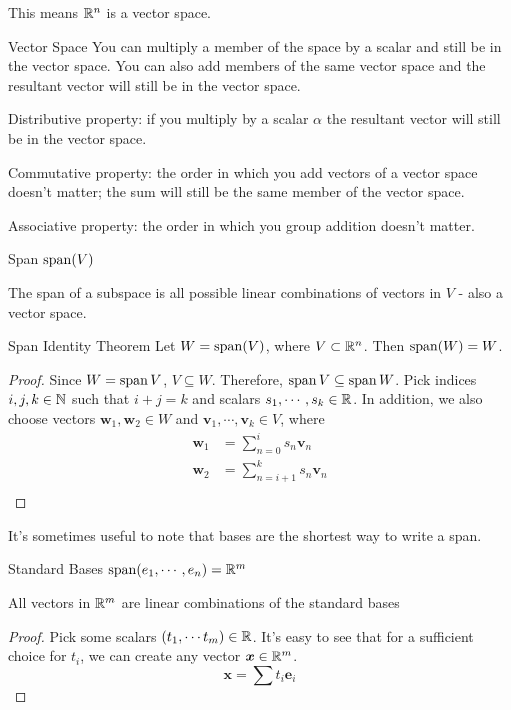 \documentclass[11pt]{article}
\begin{document}
This means $\mathbb R^n$ is a vector space.




\begin{definition}{Vector Space}
You can multiply a member of the space by a scalar and still be in the vector space.
You can also add members of the same vector space and the resultant vector will still be in the vector space.

Distributive property: if you multiply by a scalar $\alpha$ the resultant vector will still be in the vector space.

Commutative property: the order in which you add vectors of a vector space doesn't matter; the sum will still be the same member of the vector space.

Associative property: the order in which you group addition doesn't matter.
\end{definition}


\begin{definition}{Span}
  $\operatorname{span}(V)$

  The span of a subspace is all possible linear combinations of vectors in $V$ - also a vector space.
\end{definition}





\begin{theorem}{Span Identity Theorem}
  Let $W = \operatorname{span}(V)$, where $V \subset \mathbb{R}^n$.
  Then $\operatorname{span}(W) = W$.
  \begin{proof}
    Since $W = \operatorname{span} V$, $V \subseteq W$.
    Therefore, $\operatorname{span} V \subseteq \operatorname{span} W$.
    Pick indices $i, j, k \in \mathbb N $ such that $i + j = k$ and scalars $s_1, \cdots, s_k \in \mathbb R$.
    In addition, we also choose vectors $\bm{w}_1, \bm{w}_2 \in W$ and $\bm{v}_1, \cdots, \bm{v}_k \in V$, where
    \begin{align*}
      \bm{w}_1 &= \sum \limits_{n=0}^i s_n \bm{v}_n\\
      \bm{w}_2 &= \sum \limits_{n=i+1}^{k} s_n \bm{v}_n\\
    \end{align*}
    
  \end{proof}

  It's sometimes useful to note that bases are the shortest way to write a span.
\end{theorem}


\begin{theorem}{Standard Bases}
  $\operatorname{span} (e_1, \cdots, e_n) = \mathbb R^m$
  
  All vectors in $\mathbb R^m$ are linear combinations of the standard bases
  \begin{proof}
    Pick some scalars $\left ( t_1, \cdots t_m \right) \in \mathbb R$.
    It's easy to see that for a sufficient choice for $t_i$, we can create any vector $\bm{x} \in \mathbb{R}^m$.
    $$
    \bm{x} = \sum t_i \bm{e}_i
    $$
  \end{proof}
\end{theorem}
\end{document}
